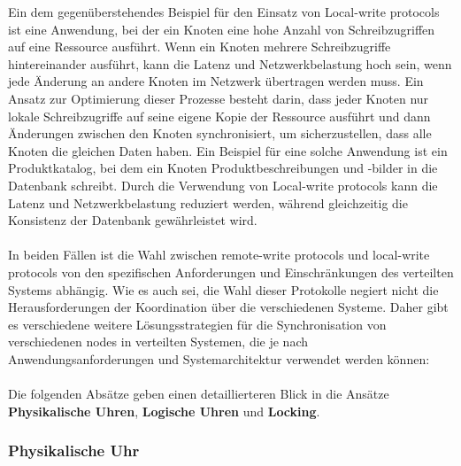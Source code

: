 Ein dem gegenüberstehendes Beispiel für den Einsatz von Local-write protocols ist eine Anwendung, bei der ein Knoten eine hohe Anzahl von Schreibzugriffen auf eine Ressource ausführt. Wenn ein Knoten mehrere Schreibzugriffe hintereinander ausführt, kann die Latenz und Netzwerkbelastung hoch sein, wenn jede Änderung an andere Knoten im Netzwerk übertragen werden muss. Ein Ansatz zur Optimierung dieser Prozesse besteht darin, dass jeder Knoten nur lokale Schreibzugriffe auf seine eigene Kopie der Ressource ausführt und dann Änderungen zwischen den Knoten synchronisiert, um sicherzustellen, dass alle Knoten die gleichen Daten haben. Ein Beispiel für eine solche Anwendung ist ein Produktkatalog, bei dem ein Knoten Produktbeschreibungen und -bilder in die Datenbank schreibt. Durch die Verwendung von Local-write protocols kann die Latenz und Netzwerkbelastung reduziert werden, während gleichzeitig die Konsistenz der Datenbank gewährleistet wird.
\\\\
In beiden Fällen ist die Wahl zwischen remote-write protocols und local-write protocols von den spezifischen Anforderungen und Einschränkungen des verteilten Systems abhängig. Wie es auch sei, die Wahl dieser Protokolle negiert nicht die Herausforderungen der Koordination über die verschiedenen Systeme. Daher gibt es verschiedene weitere Lösungsstrategien für die Synchronisation von verschiedenen nodes in verteilten Systemen, die je nach Anwendungsanforderungen und Systemarchitektur verwendet werden können:
\\\\
Die folgenden Absätze geben einen detaillierteren Blick in die Ansätze \textbf{Physikalische Uhren}, \textbf{Logische Uhren} und \textbf{Locking}. 

\subsubsection{Physikalische Uhr}

